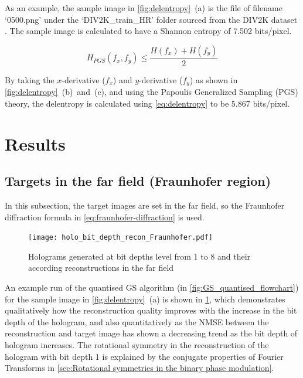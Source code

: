 	As an example, the sample image in \cref{fig:delentropy}~(a) is the file of filename `0500.png' under the `DIV2K\_train\_HR' folder sourced from the DIV2K dataset \cite{Agustsson2017}. The sample image is calculated to have a Shannon entropy of 7.502 bits/pixel.

	\begin{equation}
		H_{PGS}(f_x, f_y) \leq \frac{H(f_x) + H(f_y)}{2}
		\label{eq:delentropy}
	\end{equation}

	By taking the $x$-derivative ($f_x$) and $y$-derivative ($f_y$) as shown in \cref{fig:delentropy}~(b)~and~(c), and using the Papoulis Generalized Sampling (PGS) \cite{Papoulis1977} theory, the delentropy is calculated using \cref{eq:delentropy}\cite{Larkin2016} to be 5.867 bits/pixel.




\section{Results}
\subsection{Targets in the far field (Fraunhofer region)} \label{sec:Fraunhofer_results}
	In this subsection, the target images are set in the far field, so the Fraunhofer diffraction formula in \cref{eq:fraunhofer-diffraction} is used.

	\begin{figure} [H]
	   \begin{center}
	   \texttt{[image: holo\_bit\_depth\_recon\_Fraunhofer.pdf]}
	   \end{center}
	   \caption{\label{fig:holo_bit_depth_recon_Fraunhofer} Holograms generated at bit depths level from 1 to 8 and their according reconstructions in the far field}
	\end{figure}

	An example run of the quantised GS algorithm (in \cref{fig:GS_quantised_flowchart}) for the sample image in \cref{fig:delentropy}~(a) is shown in \cref{fig:holo_bit_depth_recon_Fraunhofer}, which demonstrates qualitatively how the reconstruction quality improves with the increase in the bit depth of the hologram, and also quantitatively as the NMSE between the reconstruction and target image has shown a decreasing trend as the bit depth of hologram increases. The rotational symmetry in the reconstruction of the hologram with bit depth 1 is explained by the conjugate properties of Fourier Transforms in \cref{sec:Rotational symmetries in the binary phase modulation}.

